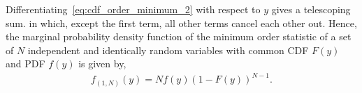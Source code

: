\documentclass[journal]{IEEEtran}
\begin{document}
Differentiating~\eqref{eq:cdf_order_minimum_2} with respect to $y$ gives a telescoping sum. %
%
%
%
%
in which, except the first term, all other terms cancel each other out. Hence, the marginal probability density function of the minimum order statistic of a set of $N$ independent and identically random variables with common CDF $F(y)$ and PDF $f(y)$ is given by,
%
%
\begin{align}
f_{(1,N)}(y) = Nf(y)\left(1-F(y)\right)^{N-1}.
\label{eq:density_order_minimum}
\end{align}
%
%
\end{document}
